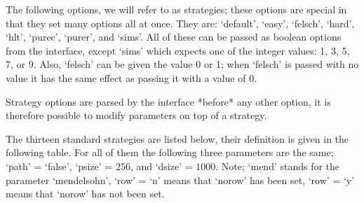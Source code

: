     The following options, we will refer to as strategies; these options
    are special in that they set many options all at once. They are:
    `default',  `easy',   `felsch', `hard', `hlt', `purec', `purer', and
    `sims'. All of these can be passed as boolean options from the {\ACE}
    interface, except `sims' which expects one of the integer values: 1,
    3, 5, 7, or 9. Also, `felsch' can be given the value 0 or 1; when
    `felsch' is passed with no value it has the same effect as passing it
    with a value of 0.

    Strategy  options  are parsed  by  the  interface  *before* any  other
    option,  it is therefore  possible to  modify parameters  on top  of a
    strategy.

    The thirteen standard strategies are listed below, their definition is
    given  in the following  table. For  all of  them the  following three
    parameters  are the  same;  `path'  = `false',  `psize'  = $256$,  and
    `dsize' = $1000$. Note;  `mend' stands for the parameter `mendelsohn',
    `row' =  `n' means that `norow' has  been set, `row' =  `y' means that
    `norow' has not been set.

